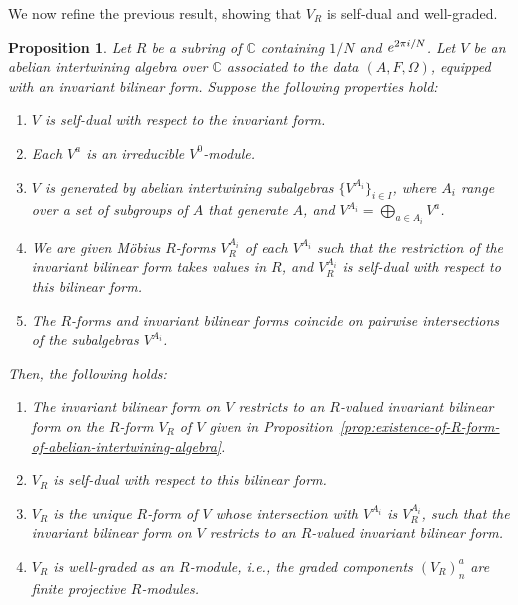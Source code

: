 \documentclass[11pt]{article}
\newcommand{\bC}{\mathbb{C}}
\newtheorem{prop}[thm]{Proposition}
\theoremstyle{definition}
\begin{document}
We now refine the previous result, showing that $V_R$ is self-dual and well-graded.

\begin{prop} \label{prop:extension-of-self-dual-form}Let $R$ be a subring of $\bC$ containing $1/N$ and ${\rm e}^{2\pi {\rm i}/N}$. Let $V$ be an abelian intertwining algebra over $\bC$ associated to the data $(A,F,\Omega)$, equipped with an invariant bilinear form. Suppose the following properties hold:
\begin{enumerate}\itemsep=0pt
\item[$1.$] $V$ is self-dual with respect to the invariant form.
\item[$2.$] Each $V^a$ is an irreducible $V^0$-module.
\item[$3.$] $V$ is generated by abelian intertwining subalgebras $\big\{V^{A_i}\big\}_{i \in I}$, where $A_i$ range over a set of subgroups of $A$ that generate $A$, and $V^{A_i} = \bigoplus_{a \in A_i} V^a$.
\item[$4.$] We are given M\"obius $R$-forms $V^{A_i}_R$ of each $V^{A_i}$ such that the restriction of the invariant bilinear form takes values in $R$, and $V^{A_i}_R$ is self-dual with respect to this bilinear form.
\item[$5.$] The $R$-forms and invariant bilinear forms coincide on pairwise intersections of the subalgebras $V^{A_i}$.
\end{enumerate}
Then, the following holds:
\begin{enumerate}\itemsep=0pt
\item[$1.$] The invariant bilinear form on $V$ restricts to an $R$-valued invariant bilinear form on the $R$-form $V_R$ of $V$ given in Proposition~{\rm \ref{prop:existence-of-R-form-of-abelian-intertwining-algebra}}.
\item[$2.$] $V_R$ is self-dual with respect to this bilinear form.
\item[$3.$] $V_R$ is the unique $R$-form of $V$ whose intersection with $V^{A_i}$ is $V^{A_i}_R$, such that the invariant bilinear form on $V$ restricts to an $R$-valued invariant bilinear form.
\item[$4.$] $V_R$ is well-graded as an $R$-module, i.e., the graded components $(V_R)^a_n$ are finite projective $R$-modules.
\end{enumerate}
\end{prop}
\end{document}
